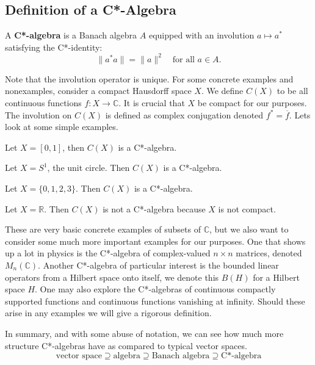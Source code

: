 \subsection{Definition of a C*-Algebra}
\begin{definition}
A \textbf{C*-algebra} is a Banach algebra \( A \) equipped with an involution \( a \mapsto a^* \) satisfying the C*-identity:
\[
\|a^*a\| = \|a\|^2 \quad \text{for all } a \in A.
\]
\end{definition}
Note that the involution operator is unique. For some concrete examples and nonexamples, consider a compact Hausdorff space $X$.
We define $C(X)$ to be all continuous functions $f: X \to \mathbb{C}$. It is crucial
that $X$ be compact for our purposes. The involution on $C(X)$ is defined as complex
conjugation denoted $f^* = \overline{f}$. Lets look at some simple examples.
\begin{example}
    Let $X = [0,1]$, then $C(X)$ is a C*-algebra.
\end{example}

\begin{example}
    Let $X = S^1$, the unit circle. Then $C(X)$ is a C*-algebra.
\end{example}

\begin{example}
    Let $X = \{ 0, 1, 2, 3\}$. Then $C(X)$ is a C*-algebra.
\end{example}

\begin{example}
    Let $X = \mathbb{R}$. Then $C(X)$ is not a C*-algebra because $X$ is not compact.
\end{example}

These are very basic concrete examples of subsets of $\mathbb{C}$, but we also want
to consider some much more important examples for our purposes. One that shows up a
lot in physics is the C*-algebra of complex-valued $n \times n$ matrices, denoted $M_n(\mathbb{C})$.
Another C*-algebra of particular interest is the bounded linear operators from a Hilbert
space onto itself, we denote this $B(H)$ for a Hilbert space $H$. One may also explore
the C*-algebras of continuous compactly supported functions and continuous functions
vanishing at infinity. Should these arise in any examples we will give a rigorous
definition.

\par

In summary, and with some abuse of notation, we can see how much more structure
C*-algebras have as compared to typical vector spaces.
\begin{equation*}
    \text{vector space} \supseteq \text{algebra} \supseteq \text{Banach algebra} \supseteq \text{C*-algebra}
\end{equation*}

